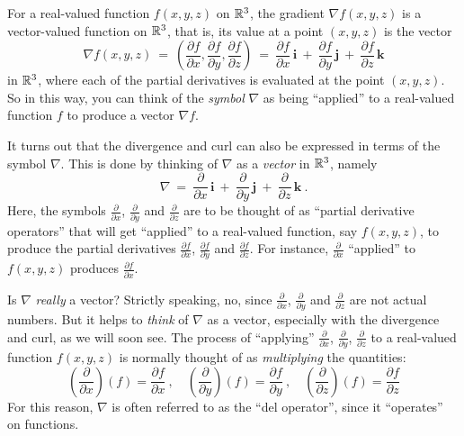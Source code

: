 For a real-valued function $f(x,y,z)$ on $\mathbb{R}^{3}$, the gradient $\nabla f(x,y,z)$ is a vector-valued function on
$\mathbb{R}^{3}$, that is, its value at a point $(x,y,z)$ is the vector
\begin{displaymath}
 \nabla f(x,y,z) ~=~ \left( \frac{\partial f}{\partial x},\frac{\partial f}{\partial y},\frac{\partial f}{\partial z}
  \right) ~=~
 \frac{\partial f}{\partial x}\,\mathbf{i} ~+~ \frac{\partial f}{\partial y}\,\mathbf{j} ~+~
 \frac{\partial f}{\partial z}\,\mathbf{k}
\end{displaymath}
in $\mathbb{R}^{3}$, where each of the partial derivatives is evaluated at the point $(x,y,z)$. So in this way, you can think
of the \emph{symbol} $\nabla$ as being ``applied'' to a real-valued function $f$ to produce a vector $\nabla f$.

It turns out that the divergence and curl can also be expressed in terms of the symbol $\nabla$. This is done by
thinking of $\nabla$ as a \emph{vector} in $\mathbb{R}^{3}$, namely\index{$\nabla$}
\begin{equation}\label{eqn:del}
 \nabla ~=~ \frac{\partial}{\partial x}\,\mathbf{i} ~+~ \frac{\partial}{\partial y}\,\mathbf{j} ~+~
   \frac{\partial}{\partial z}\,\mathbf{k} ~.
\end{equation}
Here, the symbols $\frac{\partial}{\partial x}$, $ \frac{\partial}{\partial y}$ and $\frac{\partial}{\partial z}$ are to
be thought of as ``partial derivative operators'' that will get ``applied'' to a real-valued function, say $f(x,y,z)$,
to produce the partial derivatives $\frac{\partial f}{\partial x}$, $\frac{\partial f}{\partial y}$ and
$\frac{\partial f}{\partial z}$. For instance, $\frac{\partial}{\partial x}$ ``applied'' to $f(x,y,z)$ produces
$\frac{\partial f}{\partial x}$.

Is $\nabla$ \emph{really} a vector? Strictly speaking, no, since $\frac{\partial}{\partial x}$,
$\frac{\partial}{\partial y}$ and $\frac{\partial}{\partial z}$ are not actual numbers. But it helps to
\emph{think} of $\nabla$ as a vector, especially with the divergence and curl, as we will soon see. The process of
``applying'' $\frac{\partial}{\partial x}$, $\frac{\partial}{\partial y}$, $\frac{\partial}{\partial z}$ to a
real-valued function $f(x,y,z)$ is normally thought of as \emph{multiplying} the quantities:
\begin{displaymath}
 \left( \frac{\partial}{\partial x} \right) (f) = \frac{\partial f}{\partial x} ~,\quad
 \left( \frac{\partial}{\partial y} \right) (f) = \frac{\partial f}{\partial y} ~,\quad
 \left( \frac{\partial}{\partial z} \right) (f) = \frac{\partial f}{\partial z}
\end{displaymath}
For this reason, $\nabla$ is often referred to as the ``del operator'', since it ``operates'' on functions.
 
